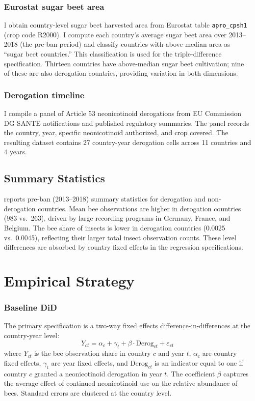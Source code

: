 \documentclass[12pt]{article}
\begin{document}
\subsubsection*{Eurostat sugar beet area} I obtain country-level sugar beet harvested area from Eurostat table \texttt{apro\_cpsh1} (crop code R2000). I compute each country's average sugar beet area over 2013--2018 (the pre-ban period) and classify countries with above-median area as ``sugar beet countries.'' This classification is used for the triple-difference specification. Thirteen countries have above-median sugar beet cultivation; nine of these are also derogation countries, providing variation in both dimensions.

\subsubsection*{Derogation timeline} I compile a panel of Article 53 neonicotinoid derogations from EU Commission DG SANTE notifications and published regulatory summaries. The panel records the country, year, specific neonicotinoid authorized, and crop covered. The resulting dataset contains 27 country-year derogation cells across 11 countries and 4 years.

\subsection{Summary Statistics}



 reports pre-ban (2013--2018) summary statistics for derogation and non-derogation countries. Mean bee observations are higher in derogation countries (983 vs.\ 263), driven by large recording programs in Germany, France, and Belgium. The bee share of insects is lower in derogation countries (0.0025 vs.\ 0.0045), reflecting their larger total insect observation counts. These level differences are absorbed by country fixed effects in the regression specifications.

\section{Empirical Strategy}
\label{sec:strategy}

\subsubsection*{Baseline DiD} The primary specification is a two-way fixed effects difference-in-differences at the country-year level:
\begin{equation}
Y_{ct} = \alpha_c + \gamma_t + \beta \cdot \text{Derog}_{ct} + \varepsilon_{ct}
\label{eq:did}
\end{equation}
where $Y_{ct}$ is the bee observation share in country $c$ and year $t$, $\alpha_c$ are country fixed effects, $\gamma_t$ are year fixed effects, and $\text{Derog}_{ct}$ is an indicator equal to one if country $c$ granted a neonicotinoid derogation in year $t$. The coefficient $\beta$ captures the average effect of continued neonicotinoid use on the relative abundance of bees. Standard errors are clustered at the country level.
\end{document}
